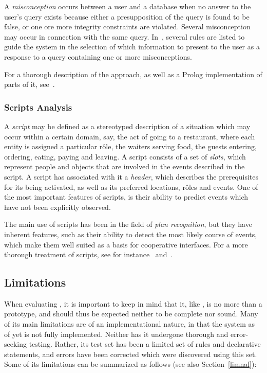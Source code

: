 A {\em misconception\/} occurs between a user and a database when no
answer to the user's query exists because either a presupposition of
the query is found to be false, or one ore more integrity constraints
are violated. Several misconception may occur in connection with the
same query. In~\cite{gal}, several rules are listed to guide the
system in the selection of which information to present to the user as
a response to a query containing one or more misconceptions.

For a thorough description of the approach, as well as a Prolog
implementation of parts of it, see~\cite{gal}.

\subsubsection{Scripts Analysis}

A {\em script\/} may be defined as a stereotyped description of a
situation which may occur within a certain domain, say, the act of
going to a restaurant, where each entity is assigned a particular
r\^{o}le, the waiters serving food, the guests entering, ordering,
eating, paying and leaving. A script consists of a set of {\em
slots\/}, which represent people and objects that are involved in the
events described in the script. A script has associated with it a {\em
header\/}, which describes the prerequisites for its being activated,
as well as its preferred locations, r\^{o}les and events. One of the
most important features of scripts, is their ability to predict events
which have not been explicitly observed.

The main use of scripts has been in the field of {\em plan
recognition\/}, but they have inherent features, such as their ability
to detect the most likely course of events, which make them well
suited as a basis for cooperative interfaces. For a more thorough
treatment of scripts, see for instance~\cite{torulf} and~\cite{rich}.

\subsection{Limitations}
\label{limsys}

When evaluating {\nash}, it is important to keep in mind that it, like
{\nal}, is no more than a prototype, and should thus be expected
neither to be complete nor sound. Many of its main limitations are of
an implementational nature, in that the system as of yet is not fully
implemented. Neither has it undergone thorough and error-seeking
testing. Rather, its test set has been a limited set of rules and
declarative statements, and errors have been corrected which were
discovered using this set. Some of its limitations can be summarized
as follows (see also Section~\ref{limnal}):

